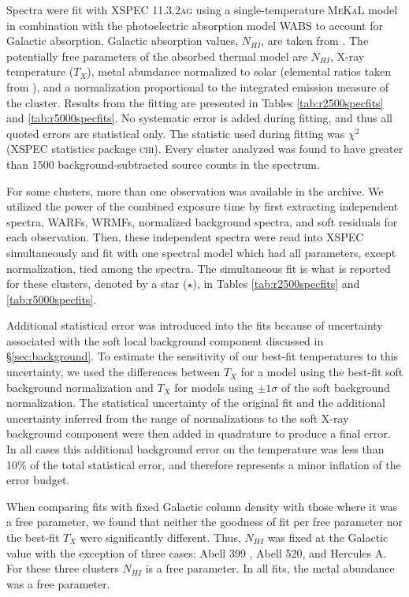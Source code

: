 \documentclass[apj]{emulateapj}
\begin{document}
Spectra were fit with {\textsc{XSPEC 11.3.2ag}} \citep{1996ASPC..101...17A}
using a single-temperature {\textsc{MeKaL}} model in combination with the
photoelectric absorption model {\textsc{WABS}} \citep{1983ApJ...270..119M}
to account for Galactic absorption. Galactic absorption values,
$N_{HI}$, are taken from \cite{1990ARA&A..28..215D}. The potentially
free parameters of the absorbed thermal model are
$N_{HI}$, X-ray temperature ($T_{X}$), metal abundance normalized to solar
(elemental ratios taken from \citealt{1989GeCoA..53..197A}), and a
normalization proportional to the integrated emission measure of the
cluster. Results from the fitting are presented in Tables
\ref{tab:r2500specfits} and \ref{tab:r5000specfits}. No
systematic error is added during fitting, and thus all quoted errors
are statistical only. The statistic used during fitting was $\chi^2$
({\textsc{XSPEC}} statistics package \textsc{chi}). Every cluster
analyzed was found to have greater than 1500 background-subtracted
source counts in the spectrum.

For some clusters, more than one observation was available in the
archive. We utilized the power of the combined exposure time by first
extracting independent spectra, WARFs, WRMFs, normalized background
spectra, and soft residuals for each observation. Then, these
independent spectra were read into \textsc{XSPEC} simultaneously and
fit with one spectral model which had all parameters, except
normalization, tied among the spectra. The simultaneous fit is what is
reported for these clusters, denoted by a star ($\star$), in Tables
\ref{tab:r2500specfits} and \ref{tab:r5000specfits}.

Additional statistical error was introduced into the fits because of
uncertainty associated with the soft local background component
discussed in \S\ref{sec:background}. To estimate the sensitivity of
our best-fit temperatures to this uncertainty, we used the differences
between $T_{X}$ for a model using the best-fit soft background
normalization and $T_{X}$ for models using $\pm1\sigma$ of the soft
background normalization. The statistical uncertainty of the original
fit and the additional uncertainty inferred from the range of
normalizations to the soft X-ray background component were then added
in quadrature to produce a final error. In all cases this additional
background error on the temperature was less than 10\% of the total
statistical error, and therefore represents a minor inflation of the
error budget.

When comparing fits with fixed Galactic column density with those
where it was a free parameter, we found that neither the goodness of
fit per free parameter nor the best-fit $T_{X}$ were significantly
different. Thus, $N_{HI}$ was fixed at the Galactic value with the
exception of three cases: Abell 399 \citep{2004MNRAS.351.1439S}, Abell
520, and Hercules A. For these three clusters $N_{HI}$ is a free
parameter. In all fits, the metal abundance was a free parameter.
\end{document}
